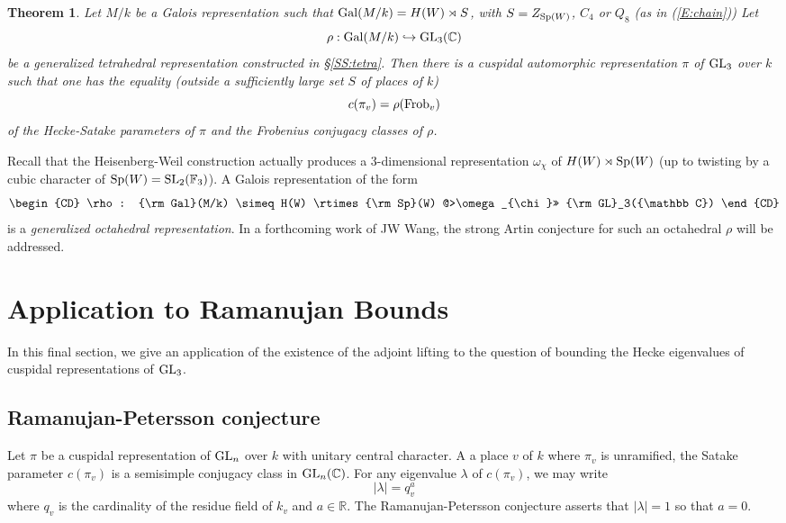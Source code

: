 \documentclass[11pt]{amsart}
\theoremstyle{plain}
\newtheorem{thm}[equation]{Theorem}
\numberwithin{equation}{section}
\newcommand{\R}{\mathbb R}
\newcommand{\C}{\mathbb C}
\def\SL{{\rm SL}}
\def\Sp{{\rm Sp}}
\def\GL{{\rm GL}}
\def\Sp{{\rm Sp}}
\def\R{{\mathbb R}}
\def\C{{\bf C}}
\def\C{{\mathbb C}}
\begin{document}
   \begin{thm} \label{T:artin2}
   Let $M/k$ be a Galois representation such that ${\rm Gal}(M/k) = H(W) \rtimes S$, with $S = Z_{\Sp(W)}$, $C_4$ or $Q_8$ (as in (\ref{E:chain})) Let 
   \[ \rho: {\rm Gal}(M/k) \hookrightarrow \GL_3(\C) \]
   be a generalized tetrahedral representation constructed in \S \ref{SS:tetra}.  Then  there is a cuspidal automorphic representation $\pi$ of $\GL_3$ over $k$ such that 
   one has the equality (outside a sufficiently large set $S$ of places of $k$)
   \[  c(\pi_v)  =  \rho({\rm Frob}_v) \]
   of the Hecke-Satake parameters  of $\pi$ and the Frobenius conjugacy  classes of $\rho$.
      \end{thm}
\vskip 5pt

Recall that the Heisenberg-Weil construction actually produces a 3-dimensional representation $\omega_{\chi}$ of $H(W) \rtimes \Sp(W)$ (up to twisting by a cubic character of $\Sp(W) = \SL_2(\mathbb{F}_3)$). A Galois representation of the form
 \[ \begin{CD}
  \rho: {\rm Gal}(M/k) \simeq H(W) \rtimes \Sp(W) @>\omega_{\chi}>> \GL_3(\C) \end{CD}  \]
is a {\it generalized octahedral representation}. In a forthcoming work of JW Wang, the strong Artin conjecture for  such an octahedral $\rho$ will be addressed.

\vskip 10pt


\section{\bf Application to Ramanujan Bounds} \label{S:Ramanujan}
In this final section,  we give an application of  the existence of the adjoint lifting to the question of bounding the Hecke eigenvalues of cuspidal representations of $\GL_3$. 
\vskip 5pt

\subsection{\bf Ramanujan-Petersson conjecture}
Let $\pi$ be a cuspidal representation of $\GL_n$ over $k$ with unitary central character. A a place $v$ of $k$ where $\pi_v$ is unramified,  the Satake parameter $c(\pi_v)$    is a semisimple conjugacy class in $\GL_n(\C)$. For any eigenvalue $\lambda$ of $c(\pi_v)$, we may write 
\[  |\lambda| = q_v^a \]
where $q_v$ is the cardinality of the residue field of $k_v$ and $a \in \R$.  The Ramanujan-Petersson conjecture asserts that $|\lambda| =1$ so that $a=0$. 
\end{document}
